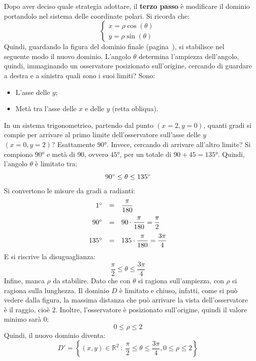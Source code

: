 \documentclass[a4paper]{article}
\begin{document}
	\noindent
	Dopo aver deciso quale strategia adottare, il \textbf{terzo passo} è modificare il dominio portandolo nel sistema delle coordinate polari. Si ricorda che:
	\begin{equation*}
		\begin{cases}
			x = \rho\cos\left(\theta\right) \\
			y = \rho\sin\left(\theta\right)
		\end{cases}
	\end{equation*}
	Quindi, guardando la figura del dominio finale (pagina~\pageref{fig: grafico ex6-3}), si stabilisce nel seguente modo il nuovo dominio. L'angolo $\theta$ determina l'ampiezza dell'angolo, quindi, immaginando un osservatore posizionato sull'origine, cercando di guardare a destra e a sinistra quali sono i suoi limiti? Sono:
	\begin{itemize}
		\item L'asse delle $y$;
		\item Metà tra l'asse delle $x$ e delle $y$ (retta obliqua).
	\end{itemize}
	In un sistema trigonometrico, partendo dal punto $\left(x=2,y=0\right)$, quanti gradi si compie per arrivare al primo limite dell'osservatore sull'asse delle $y$ $\left(x=0, y=2\right)$? Esattamente $90$°. Invece, cercando di arrivare all'altro limite? Si compiono $90$° e metà di $90$, ovvero $45$°, per un totale di $90+45=135$°. Quindi, l'angolo $\theta$ è limitato tra:
	\begin{equation*}
		90\degree \le \theta \le 135\degree
	\end{equation*}
	Si convertono le misure da gradi a radianti:
	\begin{equation*}
		\begin{array}{rcl}
			1\degree &=& \dfrac{\pi}{180} \\ [1em]
			90\degree &=& 90 \cdot \dfrac{\pi}{180} = \dfrac{\pi}{2}	\\ [1em]
			135\degree &=& 135 \cdot \dfrac{\pi}{180} = \dfrac{3\pi}{4}
		\end{array}
	\end{equation*}
	E si riscrive la disuguaglianza:
	\begin{equation*}
		\dfrac{\pi}{2} \le \theta \le \dfrac{3\pi}{4}
	\end{equation*}
	Infine, manca $\rho$ da stabilire. Dato che con $\theta$ si ragiona sull'ampiezza, con $\rho$ si ragiona sulla lunghezza. Il dominio $D$ è limitato e chiuso, infatti, come si può vedere dalla figura, la massima distanza che può arrivare la vista dell'osservatore è il raggio, cioè $2$. Inoltre, l'osservatore è posizionato sull'origine, quindi il valore minimo sarà $0$:
	\begin{equation*}
		0 \le \rho \le 2
	\end{equation*}
	Quindi, il nuovo dominio diventa:
	\begin{equation*}
		D'=\left\{\left(x,y\right) \in \mathbb{R}^{2} \: : \: \dfrac{\pi}{2} \le \theta \le \dfrac{3\pi}{4}, 0 \le \rho \le 2\right\}
	\end{equation*}\newpage
\end{document}
